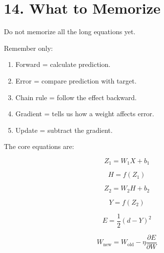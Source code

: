 \documentclass[11pt]{article}
\begin{document}
\section*{14. What to Memorize}

Do not memorize all the long equations yet.

Remember only:

\begin{enumerate}
\item Forward = calculate prediction.
\item Error = compare prediction with target.
\item Chain rule = follow the effect backward.
\item Gradient = tells us how a weight affects error.
\item Update = subtract the gradient.
\end{enumerate}

The core equations are:

\[
Z_1=W_1X+b_1
\]

\[
H=f(Z_1)
\]

\[
Z_2=W_2H+b_2
\]

\[
Y=f(Z_2)
\]

\[
E=\frac12(d-Y)^2
\]

\[
W_{\text{new}}
=
W_{\text{old}}
-
\eta\frac{\partial E}{\partial W}
\]
\end{document}
